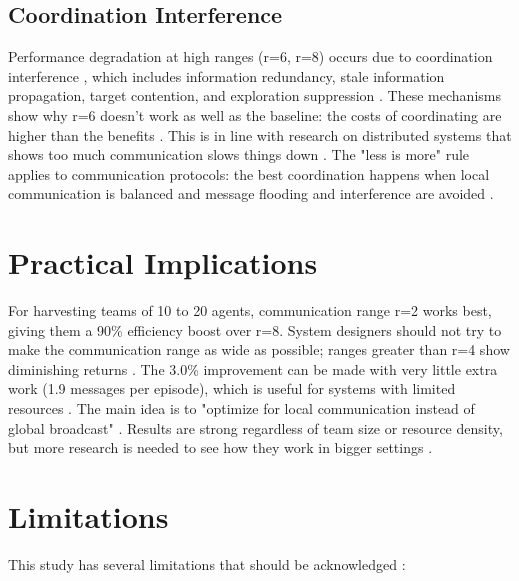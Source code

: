 \subsection{Coordination Interference}

Performance degradation at high ranges (r=6, r=8) occurs due to coordination interference \citep{lynch1996distributed}, which includes information redundancy, stale information propagation, target contention, and exploration suppression \citep{yan2013survey}. These mechanisms show why r=6 doesn't work as well as the baseline: the costs of coordinating are higher than the benefits \citep{farinelli2004multirobot}. This is in line with research on distributed systems that shows too much communication slows things down \citep{cao1997cooperative}. The "less is more" rule applies to communication protocols: the best coordination happens when local communication is balanced and message flooding and interference are avoided \citep{zhang2024}.

\section{Practical Implications}

For harvesting teams of 10 to 20 agents, communication range r=2 works best, giving them a 90\% efficiency boost over r=8. System designers should not try to make the communication range as wide as possible; ranges greater than r=4 show diminishing returns \citep{parker2008multiple}. The 3.0\% improvement can be made with very little extra work (1.9 messages per episode), which is useful for systems with limited resources \citep{bechar2016agricultural}. The main idea is to "optimize for local communication instead of global broadcast" \citep{brambilla2013swarm}. Results are strong regardless of team size or resource density, but more research is needed to see how they work in bigger settings \citep{sahin2004swarm}.

\section{Limitations}

This study has several limitations that should be acknowledged \citep{gilbert2005simulation}:

